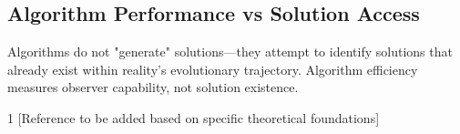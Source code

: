 \documentclass{article}
\begin{document}
\subsection{Algorithm Performance vs Solution Access}
Algorithms do not "generate" solutions—they attempt to identify solutions that already exist within reality's evolutionary trajectory. Algorithm efficiency measures observer capability, not solution existence.


\begin{thebibliography}{1}
 [Reference to be added based on specific theoretical foundations]
\end{thebibliography}
\end{document}
